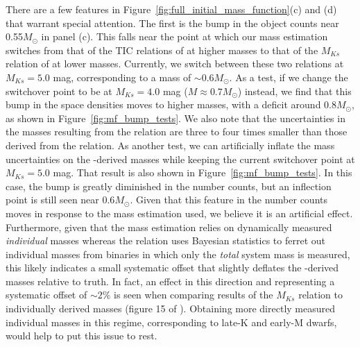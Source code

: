 \documentclass[twocolumn,tighten,twocolappendix]{aastex631}
\begin{document}
There are a few features in Figure~\ref{fig:full_initial_mass_function}(c) and (d) that warrant special attention. The first is the bump in the object counts near 0.55$M_\odot$ in panel (c). This falls near the point at which our mass estimation switches from that of the TIC relations of \cite{stassun2019} at higher masses to that of the $M_{Ks}$ relation of \cite{mann2019} at lower masses. Currently, we switch between these two relations at $M_{Ks} = 5.0$ mag, corresponding to a mass of $\sim0.6M_\odot$. As a test, if we change the switchover point to be at $M_{Ks} = 4.0$ mag ($M \approx 0.7 M_\odot$) instead, we find that this bump in the space densities moves to higher masses, with a deficit around $0.8 M_\odot$, as shown in Figure~\ref{fig:mf_bump_tests}. We also note that the uncertainties in the masses resulting from the \cite{mann2019} relation are three to four times smaller than those derived from the \cite{stassun2019} relation. As another test, we can artificially inflate the mass uncertainties on the \cite{mann2019}-derived masses while keeping the current switchover point at $M_{Ks} = 5.0$ mag. That result is also shown in Figure~\ref{fig:mf_bump_tests}. In this case, the bump is greatly diminished in the number counts, but an inflection point is still seen near 0.6$M_\odot$. Given that this feature in the number counts moves in response to the mass estimation used, we believe it is an artificial effect. Furthermore, given that the \cite{stassun2019} mass estimation relies on dynamically measured {\it individual} masses whereas the \cite{mann2019} relation uses Bayesian statistics to ferret out individual masses from binaries in which only the {\it total} system mass is measured, this likely indicates a small systematic offset that slightly deflates the \cite{mann2019}-derived masses relative to truth. In fact, an effect in this direction and representing a systematic offset of $\sim2\%$ is seen when comparing results of the $M_{Ks}$ relation to individually derived masses (figure 15 of \citealt{mann2019}). Obtaining more directly measured individual masses in this regime, corresponding to late-K and early-M dwarfs, would help to put this issue to rest.
\end{document}
